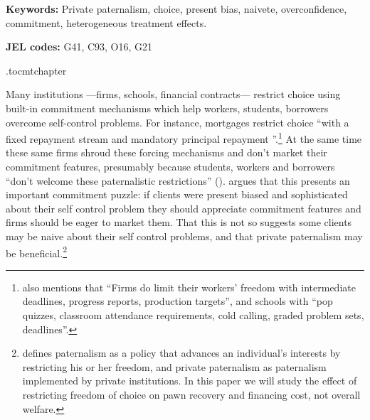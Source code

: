 \documentclass[oneside,11pt]{article}
\begin{document}
\vspace{.3in}

\textbf{Keywords: } Private paternalism, choice, present bias, naivete, overconfidence, commitment, heterogeneous treatment effects.

\textbf{JEL codes:} G41, C93, O16, G21

\newpage

\etocdepthtag.toc{mtchapter}






Many institutions ---firms, schools, financial contracts--- restrict choice using built-in commitment mechanisms which help workers, students, borrowers overcome self-control problems. For instance, mortgages restrict choice ``with a fixed repayment stream and mandatory principal repayment \citep{Laibson2018}''.\footnote{\cite{Laibson2018} also mentions that ``Firms do limit their workers' freedom with intermediate deadlines, progress reports, production targets'', and schools with ``pop quizzes, classroom attendance requirements, cold calling, graded problem sets, deadlines''.} At the same time  these same firms shroud these forcing mechanisms and don't market their commitment features, presumably because students, workers and borrowers ``don't welcome these paternalistic restrictions'' (\cite{Laibson2018}). \cite{Laibson2018} argues that this presents an important commitment puzzle: if clients were present biased and sophisticated about their self control problem they should appreciate commitment features and firms should be eager to market them. That this is not so suggests some clients may be naive about their self control problems, and that private paternalism may be beneficial.\footnote{\cite{Laibson2018} defines paternalism as a policy that advances an individual's interests by restricting his or her freedom, and private paternalism as paternalism implemented by private institutions. In this paper we will study the effect of restricting freedom of choice on pawn recovery and financing cost, not overall welfare.} 
\end{document}
